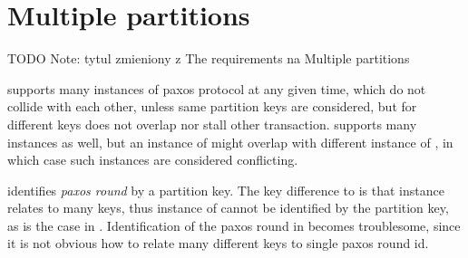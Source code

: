 
\section{Multiple partitions}\label{sec:mpp:requirements}
TODO Note: tytul zmieniony z The requirements na Multiple partitions


\lwt supports many instances of paxos protocol at any given time, which do not collide with each other, unless same partition keys are considered, but \lwt for different keys does not overlap nor stall other \lwt transaction.
\mpt supports many instances as well, but an instance of \mpt might overlap with different instance of \mpt, in which case such instances are considered conflicting. 

\lwt identifies \emph{paxos round} by a partition key. The key difference to \lwt is that \mpt instance relates to many keys, thus instance of \mpt cannot be identified by the partition key, as is the case in \lwt. Identification of the paxos round in \mpt becomes troublesome, since it is not obvious how to relate many different keys to single paxos round id. \label{sec:mpp:requirements:identifyRound}







